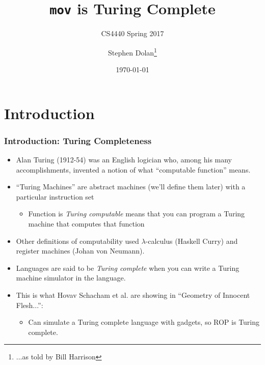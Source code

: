 \documentclass{beamer}
\title{{\tt mov} is Turing Complete}
\subtitle{CS4440 Spring 2017}
\author[]{Stephen Dolan\footnote{...as told by Bill Harrison}}
\date{\today}
\begin{document}
\frame{\titlepage}

\section{Introduction}

\begin{frame}[fragile]
\frametitle{Introduction: Turing Completeness}

\begin{itemize}
\item Alan Turing (1912-54) was an English logician who, among his many accomplishments, invented a notion of what ``computable function'' means.
\pause
\item ``Turing Machines'' are abstract machines (we'll define them later) with a particular instruction set
\begin{itemize}
\item Function is \emph{Turing computable} means that you can program a Turing machine that computes that function
\end{itemize}
\pause
\item Other definitions of computability used $\lambda$-calculus (Haskell Curry) and register machines (Johan von Neumann).

\pause 
\item Languages are said to be \emph{Turing complete} when you can write a Turing machine simulator in the language.
\pause

\item This is what Hovav Schacham et al. are showing in ``Geometry of Innocent Flesh...'': 
\begin{itemize}
\item Can simulate a Turing complete language with gadgets, so ROP is Turing complete.
\end{itemize}

\end{itemize}
\end{frame}
\end{document}
